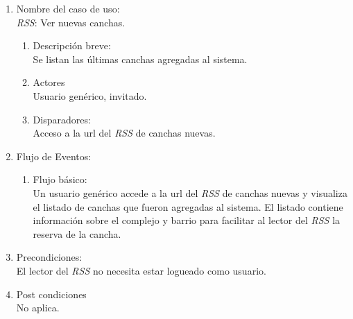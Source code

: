 \documentclass[a4paper,11pt]{article}
\begin{document}
\begin{enumerate}

	\item Nombre del caso de uso: \\
	\emph{RSS}: Ver nuevas canchas.

	\begin{enumerate}
		\item Descripción breve: \\
			Se listan las \'ultimas canchas agregadas al sistema.
		\item Actores \\
			Usuario gen\'erico, invitado.
	
		\item Disparadores: \\
			Acceso a la url del \emph{RSS} de canchas nuevas.

	\end{enumerate}

	\item Flujo de Eventos: \\

	\begin{enumerate}
		\item Flujo básico:\\
			Un usuario gen\'erico accede a la url del \emph{RSS}  de canchas nuevas
			y visualiza el listado de canchas que fueron agregadas al sistema. El
			listado contiene informaci\'on sobre el complejo y barrio para facilitar
			al lector del \emph{RSS} la reserva de la cancha.
	\end{enumerate}

	\item Precondiciones: \\
		El lector del \emph{RSS} no necesita estar logueado como usuario.

	\item Post condiciones \\
		No aplica.

\end{enumerate}
\end{document}
